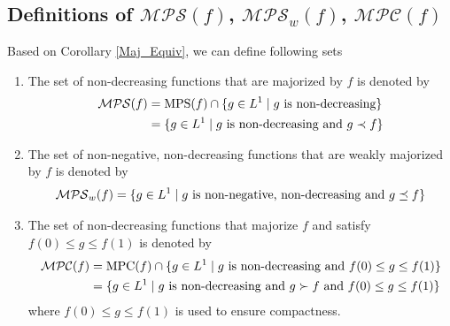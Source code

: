 \documentclass[11pt]{elegantbook}
\begin{document}
\subsection{Definitions of $\mathcal{MPS}(f)$, $\mathcal{MPS}_w(f)$, $\mathcal{MPC}(f)$}
Based on Corollary \ref{Maj_Equiv}, we can define following sets
\begin{definition}
    \normalfont
    \begin{enumerate}
        \item The set of non-decreasing functions that are majorized by $f$ is denoted by
        \begin{equation}
            \begin{aligned}
                \mathcal{MPS}(f)&=\textnormal{MPS}(f)\cap\{g\in L^1\mid g \textnormal{ is non-decreasing}\}\\
                &=\{g\in L^1\mid g \textnormal{ is non-decreasing and }g\prec f\}
            \end{aligned}
            \nonumber
        \end{equation}
        \item The set of non-negative, non-decreasing functions that are weakly majorized by $f$ is denoted by
        \begin{equation}
            \begin{aligned}
                \mathcal{MPS}_w(f)=\{g\in L^1\mid g \textnormal{ is non-negative,  non-decreasing and }g\preceq f\}
            \end{aligned}
            \nonumber
        \end{equation}
        \item The set of non-decreasing functions that majorize $f$ and satisfy $f(0)\leq g\leq f(1)$ is denoted by
        \begin{equation}
            \begin{aligned}
                \mathcal{MPC}(f)&=\textnormal{MPC}(f)\cap\{g\in L^1\mid g \textnormal{ is non-decreasing and }f(0)\leq g\leq f(1)\}\\
                &=\{g\in L^1\mid g \textnormal{ is non-decreasing and }g\succ f \textnormal{ and }f(0)\leq g\leq f(1)\}
            \end{aligned}
            \nonumber
        \end{equation}
        where $f(0)\leq g\leq f(1)$ is used to ensure compactness.
    \end{enumerate}
\end{definition}
\end{document}
